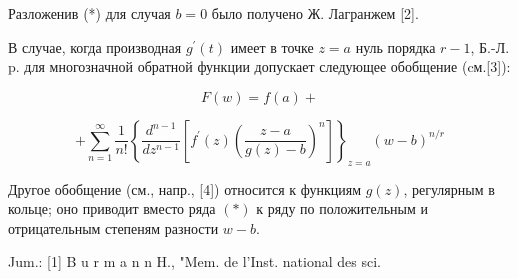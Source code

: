 \documentclass[10pt]{article}
\begin{document}
Разложенив (*) для случая $b=0$ было получено Ж. Лагранжем [2].



В случае, когда производная $g^{\prime}(t)$ имеет в точке $z=a$ нуль порядка $r-1$, Б.-Л. p. для многозначной обратной функции допускает следующее обобщение (cм.[3]):



\[

F(w)=f(a)+

\]



\[

+\sum_{n=1}^{\infty} \frac{1}{n !}\left\{\frac{d^{n-1}}{d z^{n-1}}\left[f^{\prime}(z)\left(\frac{z-a}{g(z)-b}\right)^{n}\right]\right\}_{z=a}(w-b)^{n / r}

\]



Другое обобщение (см., напр., [4]) относится к функциям $g(z)$, регулярным в кольце; оно приводит вместо ряда $(*)$ к ряду по положительным и отрицательным степеням разности $w-b$.



Jum.: [1] B u r m a n n H., "Mem. de l'Inst. national des sci.
\end{document}

